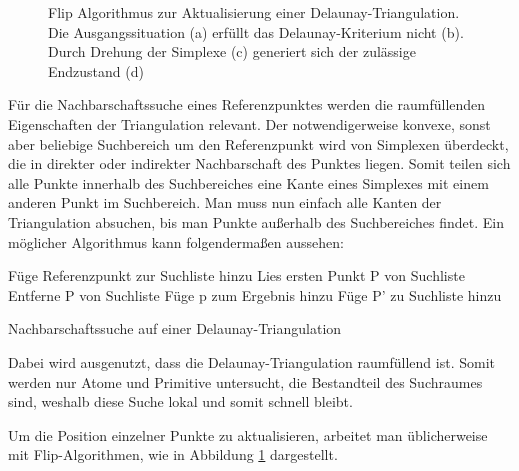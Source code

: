 \begin{figure}[bhpt]
  \centering
  \def\svgwidth{\textwidth}
  
  \caption[Delaunay-Triangulation: Flip Algorithmus]{Flip Algorithmus zur Aktualisierung einer Delaunay-Triangulation. Die Ausgangssituation (a) erfüllt das Delaunay-Kriterium nicht (b). Durch Drehung der Simplexe (c) generiert sich der zulässige Endzustand (d)}
  \label{fig:delaunay-flip}
\end{figure}


Für die Nachbarschaftssuche eines Referenzpunktes werden die raumfüllenden Eigenschaften der Triangulation relevant.
Der notwendigerweise konvexe, sonst aber beliebige Suchbereich um den Referenzpunkt wird von Simplexen überdeckt, die in direkter oder indirekter Nachbarschaft des Punktes liegen.
Somit teilen sich alle Punkte innerhalb des Suchbereiches eine Kante eines Simplexes mit einem anderen Punkt im Suchbereich.
Man muss nun einfach alle Kanten der Triangulation absuchen, bis man Punkte außerhalb des Suchbereiches findet.
Ein möglicher Algorithmus kann folgendermaßen aussehen:

\begin{algorithm}
  \centering
  \begin{algorithmic}
    \STATE Füge Referenzpunkt zur Suchliste hinzu
    \STATE Lies ersten Punkt P von Suchliste
    \STATE Entferne P von Suchliste
    \STATE Füge p zum Ergebnis hinzu
      \STATE Füge P' zu Suchliste hinzu
    \ENDIF
    \ENDFOR
    \ENDIF
    \ENDWHILE
  \end{algorithmic}
  \caption[Nachbarschaftssuche auf einer Delaunay-Triangulation]{Nachbarschaftssuche auf einer Delaunay-Triangulation}
  \label{algo:delaunay-neighbors}
\end{algorithm}


Dabei wird ausgenutzt, dass die Delaunay-Triangulation raumfüllend ist.
Somit werden nur Atome und Primitive untersucht, die Bestandteil des Suchraumes sind, weshalb diese Suche lokal und somit schnell bleibt.

Um die Position einzelner Punkte zu aktualisieren, arbeitet man üblicherweise mit Flip-Algorithmen, wie in Abbildung \ref{fig:delaunay-flip} dargestellt.

